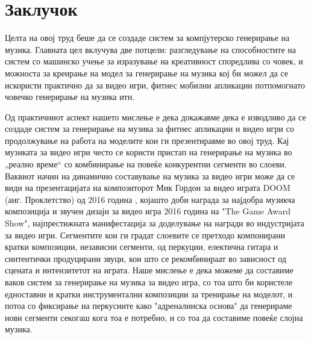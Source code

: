 \chapter{Заклучок}
\label{ch:zaklucok}

Целта на овој труд беше да се создаде систем за компјутерско генерирање на музика. Главната цел вклучува две потцели: разгледување на способностите на систем со машинско учење за изразување на креативност споредлива со човек, и можноста за креирање на модел за генерирање на музика кој би можел да се искористи практично да за видео игри, фитнес мобилни апликации потпомогнато човечко генерирање на музика итн. 

Од практичниот аспект нашето мислење е дека докажавме дека е изводливо да се создаде систем за генерирање на музика за фитнес апликации и видео игри со продолжување на работа на моделите кои ги презентиравме во овој труд. Кај музиката за видео игри често се користи пристап на генерирање на музика во „реално време“ со комбинирање на повеќе конкурентни сегменти во слоеви. Ваквиот начин на динамично составување на музика за видео игри може да се види на презентацијата на композиторот Мик Гордон за видео играта DOOM (анг. Проклетство) од 2016 година \cite{Gordon2017}, којашто доби награда за најдобра музикча композиција и звучен дизајн за видео игра 2016 година на "The Game Award Show", најпрестижната манифестација за доделување на награди во индустријата за видео игри. Сегментите кои ги градат слоевите се претходо компонирани кратки композиции, независни сегменти, од перкуции, електична гитара и синтентички продуцирани звуци, кои што се рекомбинираат во зависност од сцената и интензитетот на играта. Наше мислење е дека можеме да составиме ваков систем за генерирање на музика за видео игра, со тоа што би користеле едноставни и кратки инструментални композиции за тренирање на моделот, и потоа со фиксирање на перкусиите како "адреналинска основа" да генерираме нови сегменти секогаш кога тоа е потребно, и со тоа да составиме повеќе слојна музика. 

